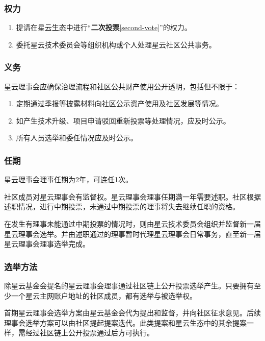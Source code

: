 \subsubsection{权力}

\begin{enumerate}
	\item 提请在星云生态中进行“\textbf{二次投票}\ref{second-vote}”的权力。
	\item 委托星云技术委员会等组织机构或个人处理星云社区公共事务。
\end{enumerate}

\subsubsection{义务}

星云理事会应确保治理流程和社区公共财产使用公开透明，包括但不限于：

\begin{enumerate}
	\item 定期通过季报等披露材料向社区公示资产使用及社区发展等情况。
	\item 如产生技术升级、项目申请驳回重新投票等处理情况，应及时公示。
	\item 所有人员选举和委任情况应及时公示。
\end{enumerate}

\subsubsection{任期}

星云理事会理事任期为2年，可连任1次。

\vspace{2em}

社区成员对星云理事会有监督权。星云理事会理事任期满一年需要述职。社区根据述职情况，进行中期投票，未通过中期投票的理事将失去继续任职的资格。

在发生有理事未能通过中期投票的情况时，则由星云技术委员会组织并监督新一届星云理事会选举。并由述职通过的理事暂时代理星云理事会日常事务，直至新一届星云理事会理事选举完成。

\subsubsection{选举方法}

除星云基金会提名的星云理事会理事通过社区链上公开投票选举产生。只要拥有至少一个星云主网账户地址的社区成员，都有选举与被选举权。

首期星云理事会选举方案由星云基金会代为提出和监督，并向社区征求意见。后续理事会选举方案可以由社区提起提案迭代。此类提案和星云生态中的其余提案一样，需经过社区链上公开投票通过后方可执行。


